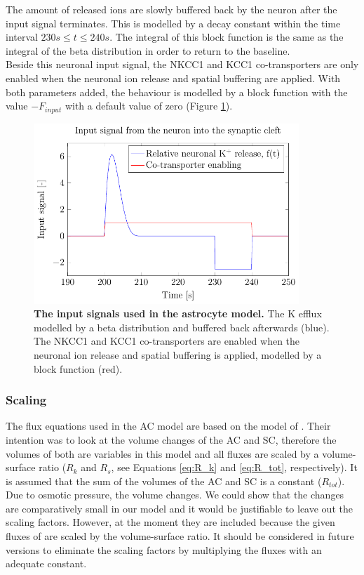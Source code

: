 The amount of released  ions are slowly buffered back by the neuron after the input signal terminates. This is modelled by a decay constant within the time interval $ 230 s \leq t \leq 240 s$. The integral of this block function is the same as the integral of the beta distribution in order to return to the baseline.\\

Beside this neuronal input signal, the NKCC1 and KCC1 co-transporters are only enabled when the neuronal ion release and spatial buffering are applied.  With both parameters added, the behaviour is modelled by a block function with the value $-F_{input}$ with a default value of zero (Figure \ref{fig:InputSignal}). \\
%
%
\begin{figure}[h!]
	\centering
	\footnotesize %
	\setlength\figureheight{6cm} 
	\setlength\figurewidth{10cm}
        \includegraphics[width = 10cm]{pics/InputSignal.pdf}
	\caption{\textbf{The input signals used in the astrocyte model.} The \gls{K} efflux modelled by a beta distribution and buffered back afterwards (blue). The NKCC1 and KCC1 co-transporters are enabled when the neuronal ion release and spatial buffering is applied, modelled by a block function (red).  }
	\label{fig:InputSignal}
\end{figure}
% 
%
\subsubsection{Scaling}
The flux equations used in the AC model are based on the model of \citet{Ostby2009}. Their intention was to look at the volume changes of the AC and SC, therefore the volumes of both are variables in this model and all fluxes are scaled by a volume-surface ratio ($R_k$ and $R_s$, see Equations \ref{eq:R_k} and \ref{eq:R_tot}, respectively). It is assumed that the sum of the volumes of the AC and SC is a constant ($R_{tot}$). Due to osmotic pressure, the volume changes. We could show that the changes are comparatively small in our model and it would be justifiable to leave out the scaling factors. However, at the moment they are included because the given fluxes of \citet{Ostby2009} are scaled by the volume-surface ratio. It should be considered in future versions to eliminate the scaling factors by multiplying the fluxes with an adequate constant. 




